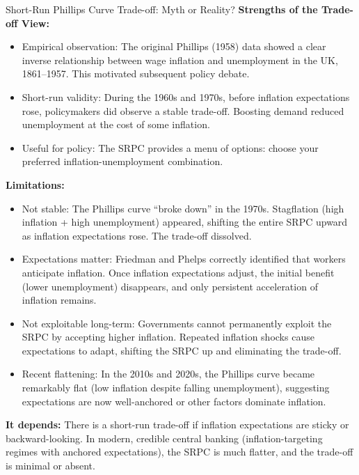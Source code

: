 \documentclass[11pt, a4paper, twoside]{book}
\begin{document}
\begin{evaluation}{Short-Run Phillips Curve Trade-off: Myth or Reality?}
\textbf{Strengths of the Trade-off View:}
\begin{itemize}
  \item Empirical observation: The original Phillips (1958) data showed a clear inverse relationship between wage inflation and unemployment in the UK, 1861--1957. This motivated subsequent policy debate.
  \item Short-run validity: During the 1960s and 1970s, before inflation expectations rose, policymakers did observe a stable trade-off. Boosting demand reduced unemployment at the cost of some inflation.
  \item Useful for policy: The SRPC provides a menu of options: choose your preferred inflation-unemployment combination.
\end{itemize}

\textbf{Limitations:}
\begin{itemize}
  \item Not stable: The Phillips curve ``broke down'' in the 1970s. Stagflation (high inflation + high unemployment) appeared, shifting the entire SRPC upward as inflation expectations rose. The trade-off dissolved.
  \item Expectations matter: Friedman and Phelps correctly identified that workers anticipate inflation. Once inflation expectations adjust, the initial benefit (lower unemployment) disappears, and only persistent acceleration of inflation remains.
  \item Not exploitable long-term: Governments cannot permanently exploit the SRPC by accepting higher inflation. Repeated inflation shocks cause expectations to adapt, shifting the SRPC up and eliminating the trade-off.
  \item Recent flattening: In the 2010s and 2020s, the Phillips curve became remarkably flat (low inflation despite falling unemployment), suggesting expectations are now well-anchored or other factors dominate inflation.
\end{itemize}

\textbf{It depends:}
There is a short-run trade-off if inflation expectations are sticky or backward-looking. In modern, credible central banking (inflation-targeting regimes with anchored expectations), the SRPC is much flatter, and the trade-off is minimal or absent.
\end{evaluation}
\end{document}
